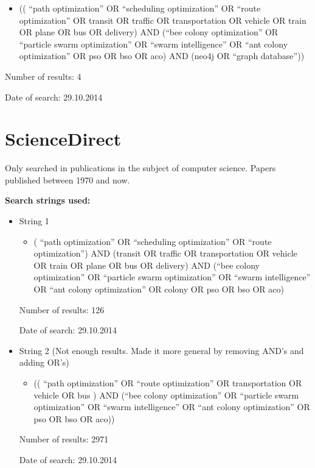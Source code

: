 \begin{itemize}
\begin{itemize}
\item (( ``path optimization'' OR ``scheduling optimization'' OR ``route optimization'' OR transit OR traffic OR transportation OR vehicle OR train OR plane OR bus OR delivery) AND (``bee colony optimization'' OR ``particle swarm optimization'' OR ``swarm intelligence'' OR ``ant colony optimization'' OR pso OR bso OR aco) AND (neo4j OR ``graph database''))
\end{itemize}
\par Number of results: 4
\par Date of search: 29.10.2014

\end{itemize}

\section{ScienceDirect}
Only searched in publications in the subject of computer science.
Papers published between 1970 and now.
\par
\textbf{Search strings used:}
\begin{itemize}
\item String 1 
\begin{itemize}
\item ( ``path optimization'' OR ``scheduling optimization'' OR ``route optimization'') AND (transit OR traffic OR transportation OR vehicle OR train OR plane OR bus OR delivery) AND (``bee colony optimization'' OR ``particle swarm optimization'' OR ``swarm intelligence'' OR ``ant colony optimization'' OR colony OR pso OR bso OR aco)
\end{itemize}
\par Number of results: 126
\par Date of search: 29.10.2014
\end{itemize}

\begin{itemize}
\item String 2 (Not enough results. Made it more general by removing AND’s and adding OR’s)
\begin{itemize}
\item (( ``path optimization'' OR ``route optimization'' OR transportation OR vehicle OR bus ) AND (``bee colony optimization'' OR ``particle swarm optimization'' OR ``swarm intelligence'' OR ``ant colony optimization'' OR pso OR bso OR aco))
\end{itemize}
\par Number of results: 2971
\par Date of search: 29.10.2014
\end{itemize}

